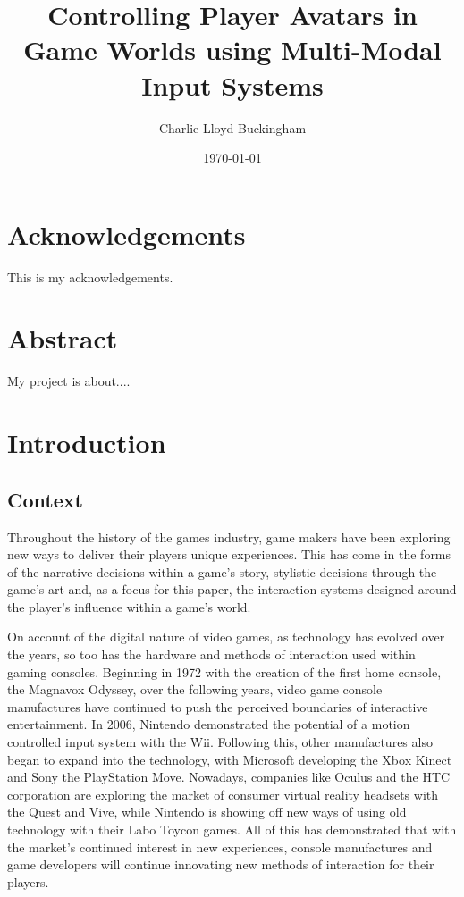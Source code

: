 \documentclass[11pt, a4paper]{article}
\title{Controlling Player Avatars in Game Worlds using Multi-Modal Input Systems}
\author{Charlie Lloyd-Buckingham}
\date{\today}
\begin{document}
\maketitle



\pagebreak
\section{Acknowledgements}	
This is my acknowledgements.

\section{Abstract}	
My project is about....



\pagebreak
\tableofcontents				%



\pagebreak
\section{Introduction}	
\subsection{Context}
Throughout the history of the games industry, game makers have been exploring new ways to deliver their players unique experiences. This has come in the forms of the narrative decisions within a game's story, stylistic decisions through the game's art and, as a focus for this paper, the interaction systems designed around the player's influence within a game's world. 

\hfill

On account of the digital nature of video games, as technology has evolved over the years, so too has the hardware and methods of interaction used within gaming consoles. Beginning in 1972 with the creation of the first home console, the Magnavox Odyssey, over the following years, video game console manufactures have continued to push the perceived boundaries of interactive entertainment. In 2006, Nintendo demonstrated the potential of a motion controlled input system with the Wii. Following this, other manufactures also began to expand into the technology, with Microsoft developing the Xbox Kinect and Sony the PlayStation Move. Nowadays, companies like Oculus and the HTC corporation are exploring the market of consumer virtual reality headsets with the Quest and Vive, while Nintendo is showing off new ways of using old technology with their Labo Toycon games. All of this has demonstrated that with the market's continued interest in new experiences, console manufactures and game developers will continue innovating new methods of interaction for their players.
\end{document}
